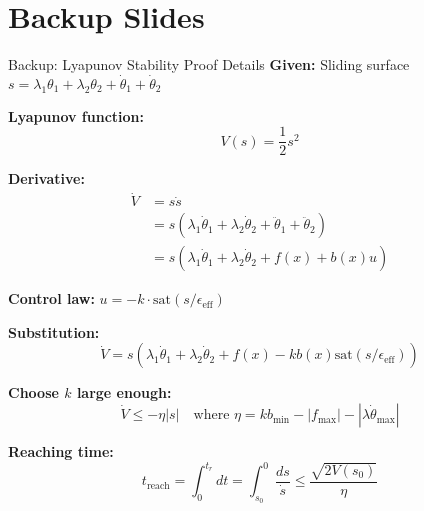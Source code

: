 \documentclass[10pt,aspectratio=169]{beamer}
\begin{document}
\appendix
\section*{Backup Slides}

\begin{frame}{Backup: Lyapunov Stability Proof Details}
\textbf{Given:} Sliding surface $s = \lambda_1 \theta_1 + \lambda_2 \theta_2 + \dot{\theta}_1 + \dot{\theta}_2$

\textbf{Lyapunov function:}
\[
V(s) = \frac{1}{2} s^2
\]

\textbf{Derivative:}
\begin{align*}
\dot{V} &= s \dot{s} \\
&= s \left( \lambda_1 \dot{\theta}_1 + \lambda_2 \dot{\theta}_2 + \ddot{\theta}_1 + \ddot{\theta}_2 \right) \\
&= s \left( \lambda_1 \dot{\theta}_1 + \lambda_2 \dot{\theta}_2 + f(x) + b(x)u \right)
\end{align*}

\textbf{Control law:} $u = -k \cdot \text{sat}(s/\epsilon_{\text{eff}})$

\textbf{Substitution:}
\[
\dot{V} = s \left( \lambda_1 \dot{\theta}_1 + \lambda_2 \dot{\theta}_2 + f(x) - k b(x) \text{sat}(s/\epsilon_{\text{eff}}) \right)
\]

\textbf{Choose $k$ large enough:}
\[
\dot{V} \leq -\eta |s| \quad \text{where } \eta = kb_{\min} - |f_{\max}| - |\lambda \dot{\theta}_{\max}|
\]

\textbf{Reaching time:}
\[
t_{\text{reach}} = \int_0^{t_r} dt = \int_{s_0}^{0} \frac{ds}{\dot{s}} \leq \frac{\sqrt{2V(s_0)}}{\eta}
\]
\end{frame}
\end{document}
